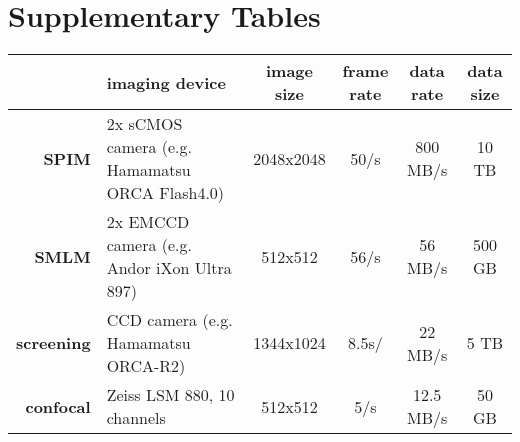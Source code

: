 \section{Supplementary Tables}
\label{app:tables}


\begin{table}[hbp]  
  \begin{small}
    \renewcommand{\arraystretch}{2}
    \centering
    \begin{tabular}{rp{5cm}cccc}
        & \textbf{imaging device} & \textbf{image size} &  \parbox[c]{1.2cm}{\textbf{frame}\\ \textbf{rate}} & \textbf{data rate} & \parbox[c]{1.2cm}{\textbf{data\\ size}} \\
        \hline
        \hline
        \textbf{SPIM} & 2x sCMOS camera (e.g. Hamamatsu ORCA Flash4.0) & 2048x2048 & 50/s & 800 MB/s & 10 TB \\ \hline
        \textbf{SMLM} & 2x EMCCD camera (e.g. Andor iXon Ultra 897) & 512x512 & 56/s & 56 MB/s & 500 GB \\ \hline
        \textbf{screening} & CCD camera (e.g. Hamamatsu ORCA-R2) & 1344x1024 & 8.5s/ & 22 MB/s & 5 TB \\ \hline
        \textbf{confocal} & Zeiss LSM 880, 10 channels & 512x512 & 5/s & 12.5 MB/s & 50 GB \\ 
    \end{tabular}
    \label{tab:sizes}
  \end{small}
\end{table}


  


